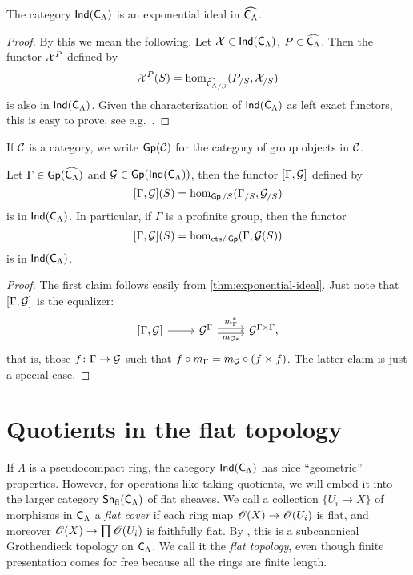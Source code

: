 \documentclass[phd,cornellheadings,draft]{cornell}
\begin{document}
\begin{lemma}\label{thm:exponential-ideal}
The category $\operatorname{\mathsf{Ind}}(\mathsf{C}_\Lambda)$ is an exponential ideal in 
$\widehat{\mathsf{C}_\Lambda}$. 
\end{lemma}
\begin{proof}
By this we mean the following. Let $\mathcal{X}\in \operatorname{\mathsf{Ind}}(\mathsf{C}_\Lambda)$, 
$P\in \widehat{\mathsf{C}_\Lambda}$. Then the functor $\mathcal{X}^P$ defined by 
\[
	\mathcal{X}^P(S) = \hom_{\widehat{\mathsf{C}_\Lambda}_{/S}}(P_{/S},\mathcal{X}_{/S}) 
\]
is also in $\operatorname{\mathsf{Ind}}(\mathsf{C}_\Lambda)$. Given the characterization of 
$\operatorname{\mathsf{Ind}}(\mathsf{C}_\Lambda)$ as left exact functors, this is easy to 
prove, see e.g.~\cite[4.2.3]{johnstone-2002}. 
\end{proof}

If $\mathcal{C}$ is a category, we write $\operatorname{\mathsf{Gp}}(\mathcal{C})$ for the category of group 
objects in $\mathcal{C}$. 

\begin{corollary}\label{thm:framed-deformation}
Let $\Gamma\in \operatorname{\mathsf{Gp}}(\widehat{\mathsf{C}_\Lambda})$ and 
$\mathcal{G}\in \operatorname{\mathsf{Gp}}(\operatorname{\mathsf{Ind}}(\mathsf{C}_\Lambda))$, then the functor 
$[\Gamma,\mathcal{G}]$ defined by 
\[
	[\Gamma,\mathcal{G}](S) = \hom_{\operatorname{\mathsf{Gp}}/S}(\Gamma_{/S},\mathcal{G}_{/S}) 
\]
is in $\operatorname{\mathsf{Ind}}(\mathsf{C}_\Lambda)$. In particular, if $\Gamma$ is a 
profinite group, then the functor 
\[
	[\Gamma,\mathcal{G}](S) = \hom_{\mathrm{cts}/\operatorname{\mathsf{Gp}}}(\Gamma,\mathcal{G}(S))
\]
is in $\operatorname{\mathsf{Ind}}(\mathsf{C}_\Lambda)$. 
\end{corollary}
\begin{proof}
The first claim follows easily from \ref{thm:exponential-ideal}. Just note 
that $[\Gamma,\mathcal{G}]$ is the equalizer:
\[
\begin{tikzcd}
	{[\Gamma,\cG]} \ar[r]
		& \cG^\Gamma \ar[r, "m_\Gamma^\ast", shift left=.5ex] \ar[r, "m_{\cG\ast}"', shift right=.5ex]
		& \cG^{\Gamma\times \Gamma} ,
\end{tikzcd}
\]
that is, those $f\colon \Gamma\to \mathcal{G}$ such that 
$f\circ m_\Gamma = m_{\mathcal{G}}\circ(f\times f)$. The latter claim is just 
a special case. 
\end{proof}





\section{Quotients in the flat topology}

If $\Lambda$ is a pseudocompact ring, the category 
$\operatorname{\mathsf{Ind}}(\mathsf{C}_\Lambda)$ has nice ``geometric'' properties. However, 
for operations like taking quotients, we will embed it into the larger category 
$\operatorname{\mathsf{Sh}}_{\mathrm{fl}}(\mathsf{C}_\Lambda)$ of flat sheaves. We call a collection 
$\{U_i\to X\}$ of morphisms in $\mathsf{C}_\Lambda$ a \emph{flat cover} if each 
ring map $\mathscr{O}(X)\to \mathscr{O}(U_i)$ is flat, and moreover 
$\mathscr{O}(X)\to \prod \mathscr{O}(U_i)$ is faithfully flat. By \cite[IV 6.3.1]{sga3-1}, this 
is a subcanonical Grothendieck topology on $\mathsf{C}_\Lambda$. We call it the 
\emph{flat topology}, even though finite presentation comes for free because 
all the rings are finite length. 
\end{document}
